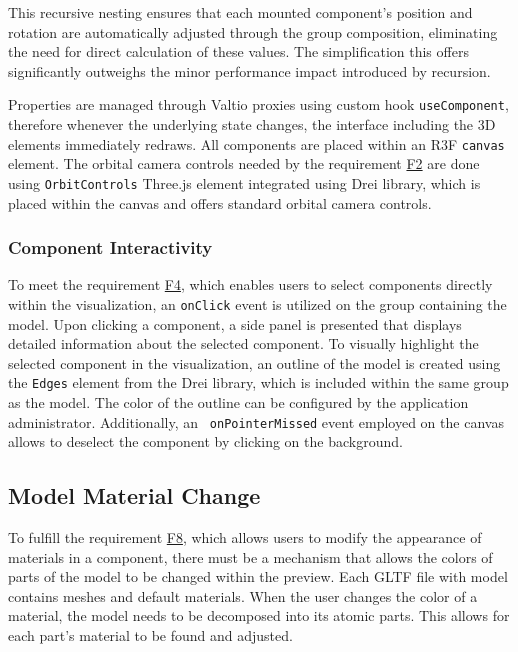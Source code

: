 This recursive nesting ensures that each mounted component's position and rotation are automatically adjusted through the group composition, eliminating the need for direct calculation of these values. The simplification this offers significantly outweighs the minor performance impact introduced by recursion.

Properties are managed through Valtio proxies using custom hook \texttt{useComponent}, therefore whenever the underlying state changes, the interface including the 3D elements immediately redraws.
All components are placed within an R3F \texttt{canvas} element. The orbital camera controls needed by the requirement \hyperref[itm:F2]{F2} are done using \texttt{OrbitControls} Three.js element integrated using Drei library, which is placed within the canvas and offers standard orbital camera controls.


\subsubsection{Component Interactivity}

To meet the requirement \hyperref[itm:F4]{F4}, which enables users to select components directly within the visualization, an \texttt{onClick} event is utilized on the group containing the model. Upon clicking a component, a side panel is presented that displays detailed information about the selected component. To visually highlight the selected component in the visualization, an outline of the model is created using the \texttt{Edges} element from the Drei library, which is included within the same group as the model. The color of the outline can be configured by the application administrator. Additionally, an \texttt{ onPointerMissed} event employed on the canvas allows to deselect the component by clicking on the background.


\subsection{Model Material Change}

To fulfill the requirement \hyperref[itm:F8]{F8}, which allows users to modify the appearance of materials in a component, there must be a mechanism that allows the colors of parts of the model to be changed within the preview. Each GLTF file with model contains meshes and default materials. When the user changes the color of a material, the model needs to be decomposed into its atomic parts. This allows for each part's material to be found and adjusted. 

